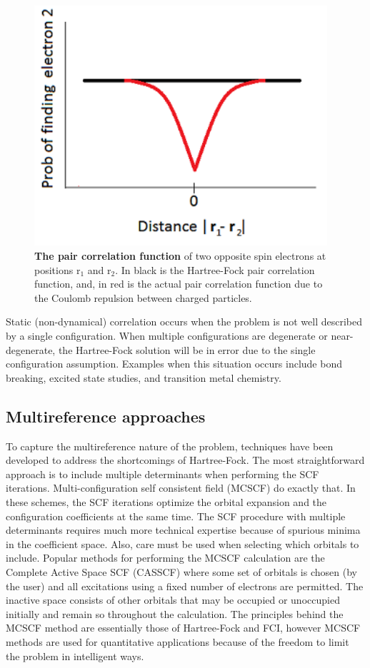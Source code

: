 \documentclass[11pt,oneside,final]{huthesis}%
\begin{document}
\begin{figure}
	\begin{center}
\includegraphics*[width=4.27in]{./figures/image8.png}
	\end{center}
\caption{\textbf{The pair correlation function} of two opposite spin electrons at positions r${}_{1}$ and r${}_{2}$.  In black is the Hartree-Fock pair correlation function, and, in red is the actual pair correlation function due to the Coulomb repulsion between charged particles.}\label{fig:pc}
\end{figure}

Static (non-dynamical) correlation occurs when the problem is not well described by a single configuration.  When multiple configurations are degenerate or near-degenerate, the Hartree-Fock solution will be in error due to the single configuration assumption.   Examples when this situation occurs include bond breaking, excited state studies, and transition metal chemistry.  

\subsection{Multireference approaches}

To capture the multireference nature of the problem, techniques have been developed to address the shortcomings of Hartree-Fock.  The most straightforward approach is to include multiple determinants when performing the SCF iterations.  Multi-configuration self consistent field (MCSCF) do exactly that.  In these schemes, the SCF iterations optimize the orbital expansion and the configuration coefficients at the same time.  The SCF procedure with multiple determinants requires much more technical expertise because of spurious minima in the coefficient space. Also, care must be used when selecting which orbitals to include.  Popular methods for performing the MCSCF calculation are the Complete Active Space SCF (CASSCF) where some set of orbitals is chosen (by the user) and all excitations using a fixed number of electrons are permitted.  The inactive space consists of other orbitals that may be occupied or unoccupied initially and remain so throughout the calculation. The principles behind the MCSCF method are essentially those of Hartree-Fock and FCI, however MCSCF methods are used for quantitative applications because of the freedom to limit the problem in intelligent ways.
\end{document}
